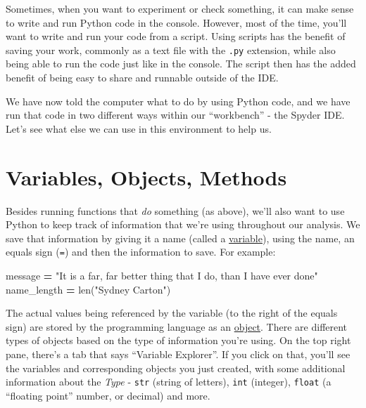 \documentclass[]{Nemilov}
\newenvironment{Shaded}{\begin{snugshade}}{\end{snugshade}}
\newcommand{\BuiltInTok}[1]{#1}
\newcommand{\NormalTok}[1]{#1}
\newcommand{\OperatorTok}[1]{\textcolor[rgb]{0.81,0.36,0.00}{\textbf{#1}}}
\newcommand{\StringTok}[1]{\textcolor[rgb]{0.31,0.60,0.02}{#1}}
\begin{document}
Sometimes, when you want to experiment or check something, it can make sense
to write and run Python code in the console. However, most of the time, you'll
want to write and run your code from a script. Using
scripts has the benefit of saving your work, commonly as a text file with the
\texttt{.py} extension, while also being able to run
the code just like in the console. The script then has the added benefit of
being easy to share and runnable outside of the IDE.

We have now told the computer what to do by using Python code, and we have run that
code in two different ways within our ``workbench'' - the Spyder IDE. Let's
see what else we can use in this environment to help us.

\hypertarget{py-getting-started-objects}{%
\section{Variables, Objects, Methods}\label{py-getting-started-objects}}

Besides running functions that \emph{do} something (as above), we'll also want
to use Python to keep track of information that we're using throughout
our analysis. We save that information by giving it a name (called a \href{glossary.html\#variable}{variable}),
using the name, an equals sign (\texttt{=}) and then the information to save.
For example:

\begin{Shaded}
\begin{Highlighting}[]
\NormalTok{message }\OperatorTok{=} \StringTok{"It is a far, far better thing that I do, than I have ever done"}
\NormalTok{name_length }\OperatorTok{=} \BuiltInTok{len}\NormalTok{(}\StringTok{"Sydney Carton"}\NormalTok{)}
\end{Highlighting}
\end{Shaded}

The actual values being referenced by the variable (to the right of
the equals sign) are stored by the
programming language as an \href{glossary.html\#object}{object}. There are different
types of objects based on the type of information you're using.
On the top right pane, there's a
tab that says ``Variable Explorer''. If you click on that, you'll see the
variables and corresponding objects you just created,
with some additional information about the \emph{Type} - \texttt{str} (string of letters),
\texttt{int} (integer), \texttt{float} (a ``floating point'' number, or decimal) and more.
\end{document}
